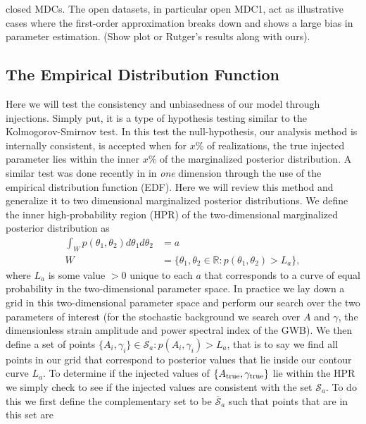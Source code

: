 \documentclass[iop]{emulateapj} \usepackage{apjfonts}
\newcommand{\be}{\begin{equation}} \newcommand{\ee}{\end{equation}}
\begin{document}
closed MDCs. The open datasets, in particular open MDC1, act as
illustrative cases where the first-order approximation breaks down and
shows a large bias in parameter estimation. (Show plot or Rutger's
results along with ours).


\subsection{The Empirical Distribution Function} \label{sec:edf}

Here we will test the consistency and unbiasedness of our model
through injections. Simply put, it is a type of hypothesis testing
similar to the Kolmogorov-Smirnov test. In this test the
null-hypothesis, our analysis method is internally consistent, is
accepted when for $x$\% of realizations, the true injected parameter
lies within the inner $x$\% of the marginalized posterior
distribution. A similar test was done recently in \cite{vhl12} in
\emph{one} dimension through the use of the empirical distribution
function (EDF). Here we will review this method and generalize it to
two dimensional marginalized posterior distributions. We define the
inner high-probability region (HPR) of the two-dimensional
marginalized posterior distribution as \be \begin{split}
\int_{W}p(\theta_{1},\theta_{2})d\theta_{1}d\theta_{2}&=a\\ W&=\{
\theta_{1},\theta_{2}\in \mathbb{R} :
p(\theta_{1},\theta_{2})>L_{a}\}, \label{eq:hpr} \end{split} \ee where
$L_{a}$ is some value $>0$ unique to each $a$ that corresponds to a
curve of equal probability in the two-dimensional parameter space. In
practice we lay down a grid in this two-dimensional parameter space
and perform our search over the two parameters of interest (for the
stochastic background we search over $A$ and $\gamma$, the
dimensionless strain amplitude and power spectral index of the GWB).
We then define a set of points $\{A_{i},\gamma_{i}\}\in
\mathcal{S}_{a} : p(A_{i},\gamma_{i})>L_{a}$, that is to say we find
all points in our grid that correspond to posterior values that lie
inside our contour curve $L_{a}$. To determine if the injected values
of $\{A_{\rm true},\gamma_{\rm true}\}$ lie within the HPR we simply
check to see if the injected values are consistent with the set
$\mathcal{S}_{a}$. To do this we first define the complementary set to
be $\bar{\mathcal{S}}_{a}$ such that points that are in this set are
\end{document}
